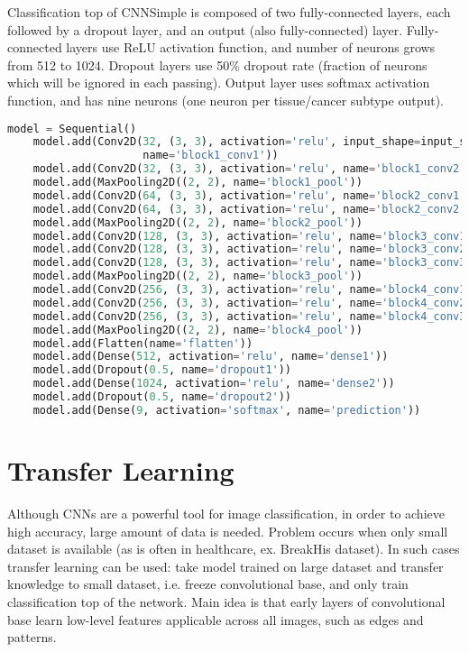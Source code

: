 Classification top of CNNSimple is composed of two fully-connected layers, each followed by a dropout layer, and an output (also fully-connected) layer. Fully-connected layers use ReLU activation function, and number of neurons grows from 512 to 1024. Dropout layers use 50\% dropout rate (fraction of neurons which will be ignored in each passing). Output layer uses softmax activation function, and has nine neurons (one neuron per tissue/cancer subtype output). 
\vspace{1mm}
\begin{lstlisting}[language={Python}, basicstyle=\scriptsize]
	model = Sequential()
	model.add(Conv2D(32, (3, 3), activation='relu', input_shape=input_shape,     
	                 name='block1_conv1'))
	model.add(Conv2D(32, (3, 3), activation='relu', name='block1_conv2'))
	model.add(MaxPooling2D((2, 2), name='block1_pool'))
	model.add(Conv2D(64, (3, 3), activation='relu', name='block2_conv1'))
	model.add(Conv2D(64, (3, 3), activation='relu', name='block2_conv2'))
	model.add(MaxPooling2D((2, 2), name='block2_pool'))
	model.add(Conv2D(128, (3, 3), activation='relu', name='block3_conv1'))
	model.add(Conv2D(128, (3, 3), activation='relu', name='block3_conv2'))
	model.add(Conv2D(128, (3, 3), activation='relu', name='block3_conv3'))
	model.add(MaxPooling2D((2, 2), name='block3_pool'))
	model.add(Conv2D(256, (3, 3), activation='relu', name='block4_conv1'))
	model.add(Conv2D(256, (3, 3), activation='relu', name='block4_conv2'))
	model.add(Conv2D(256, (3, 3), activation='relu', name='block4_conv3'))
	model.add(MaxPooling2D((2, 2), name='block4_pool'))
	model.add(Flatten(name='flatten'))
	model.add(Dense(512, activation='relu', name='dense1'))
	model.add(Dropout(0.5, name='dropout1'))
	model.add(Dense(1024, activation='relu', name='dense2'))
	model.add(Dropout(0.5, name='dropout2'))
	model.add(Dense(9, activation='softmax', name='prediction'))
\end{lstlisting} 

\section{Transfer Learning}
\label{vgg19}

Although CNNs are a powerful tool for image classification, in order to achieve high accuracy, large amount of data is needed. Problem occurs when only small dataset is available (as is often in healthcare, ex. BreakHis dataset). In such cases transfer learning can be used: take model trained on large dataset and transfer knowledge to small dataset, i.e. freeze convolutional base, and only train classification top of the network. Main idea is that early layers of convolutional base learn low-level features applicable across all images, such as edges and patterns.


